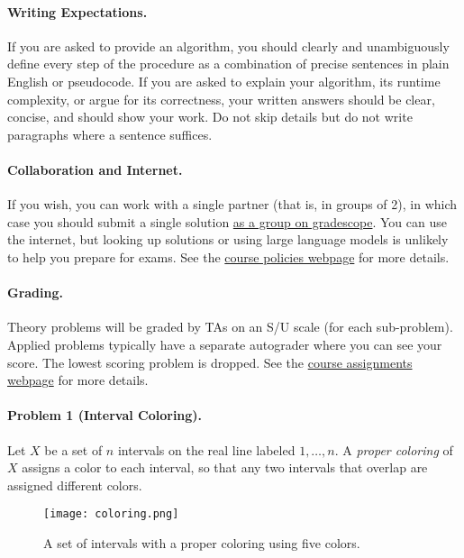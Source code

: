 \documentclass[11pt]{article}
\begin{document}
\paragraph{Writing Expectations.} If you are asked to provide an algorithm, you should clearly and unambiguously define every step of the procedure as a combination of precise sentences in plain English or pseudocode. If you are asked to explain your algorithm, its runtime complexity, or argue for its correctness, your written answers should be clear, concise, and should show your work. Do not skip details but do not write paragraphs where a sentence suffices.

\paragraph{Collaboration and Internet.} If you wish, you can work with a single partner (that is, in groups of 2), in which case you should submit a single solution \href{https://help.gradescope.com/article/m5qz2xsnjy-student-add-group-members}{as a group on gradescope}. You can use the internet, but looking up solutions or using large language models is unlikely to help you prepare for exams. See the \href{https://sites.duke.edu/spring24compsci330/policies/}{course policies webpage} for more details.

\paragraph{Grading.} Theory problems will be graded by TAs on an S/U scale (for each sub-problem). Applied problems typically have a separate autograder where you can see your score. The lowest scoring problem is dropped. See the \href{https://sites.duke.edu/spring24compsci330/assignments/}{course assignments webpage} for more details.



\newpage
\paragraph{Problem 1 (Interval Coloring).} Let $X$ be a set of $n$ intervals on the real line labeled $1, \dots, n$. A \textit{proper coloring} of $X$ assigns a color to each interval, so that any two intervals that overlap are assigned different colors. 

\begin{figure}[h]
\centering
\texttt{[image: coloring.png]}
\caption{A set of intervals with a proper coloring using five colors.}
\end{figure}
\end{document}
